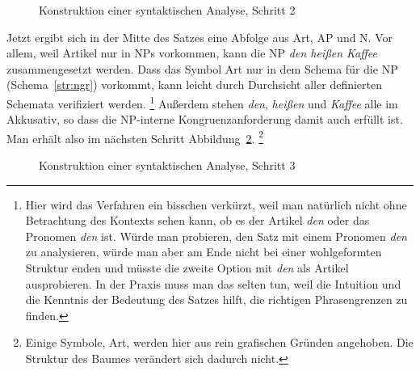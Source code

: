 \begin{figure}
  \caption{Konstruktion einer syntaktischen Analyse, Schritt 2}
  \label{fig:sya02}
\end{figure}

Jetzt ergibt sich in der Mitte des Satzes eine Abfolge aus Art, AP und N.
Vor allem, weil Artikel nur in NPs vorkommen, kann die NP \textit{den heißen Kaffee} zusammengesetzt werden.
Dass das Symbol Art nur in dem Schema für die NP (Schema~\ref{str:ngr}) vorkommt, kann leicht durch Durchsicht aller definierten Schemata verifiziert werden.%
\footnote{Hier wird das Verfahren ein bisschen verkürzt, weil man natürlich nicht ohne Betrachtung des Kontexts sehen kann, ob es der Artikel \textit{den} oder das Pronomen \textit{den} ist.
Würde man probieren, den Satz mit einem Pronomen \textit{den} zu analysieren, würde man aber am Ende nicht bei einer wohlgeformten Struktur enden und müsste die zweite Option mit \textit{den} als Artikel ausprobieren.
In der Praxis muss man das selten tun, weil die Intuition und die Kenntnis der Bedeutung des Satzes hilft, die richtigen Phrasengrenzen zu finden.}
Außerdem stehen \textit{den}, \textit{heißen} und \textit{Kaffee} alle im Akkusativ, so dass die NP-interne Kongruenzanforderung damit  auch erfüllt ist.
Man erhält also im nächsten Schritt Abbildung~\ref{fig:sya03}.%
\footnote{Einige Symbole, \zB Art, werden hier aus rein grafischen Gründen angehoben.
Die Struktur des Baumes verändert sich dadurch nicht.}

\begin{figure}
  \caption{Konstruktion einer syntaktischen Analyse, Schritt 3}
  \label{fig:sya03}
\end{figure}

